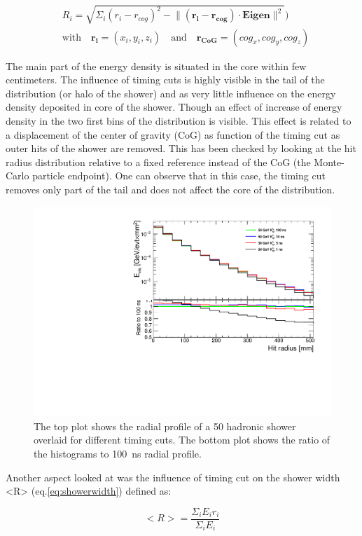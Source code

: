 \begin{equation} \label{eq:radialprof}
  \begin{split}
    & R_{i} = \sqrt{\Sigma_{i} (r_{i} - r_{cog})^{2} - \lVert (\mathbf{r_{i}} - \mathbf{r_{cog}}) \cdot \mathbf{Eigen} \rVert^{2}}) \\
    & \text{with} \quad \mathbf{r_{i}} = (x_i, y_i, z_i) \quad \text{and} \quad \mathbf{r_{CoG}} = (cog_x, cog_y, cog_z)
  \end{split}
\end{equation}

The main part of the energy density is situated in the core within few centimeters. The influence of timing cuts is highly visible in the tail of the distribution (or halo of the shower) and as very little influence on the energy density deposited in core of the shower. Though an effect of increase of energy density in the two first bins of the distribution is visible. This effect is related to a displacement of the center of gravity (CoG) as function of the timing cut as outer hits of the shower are removed. This has been checked by looking at the hit radius distribution relative to a fixed reference instead of the CoG (the Monte-Carlo particle endpoint). One can observe that in this case, the timing cut removes only part of the tail and does not affect the core of the distribution.

\begin{figure}[htbp!]
  \centering
  \includegraphics[width=0.5\linewidth]{chap6/fig_TimingILD/NoSmearing/RadialProfileOverlay_noSmearing}
  \caption{The top plot shows the radial profile of a 50 \GeV hadronic shower overlaid for different timing cuts. The bottom plot shows the ratio of the histograms to \SI{100}{\nano\second} radial profile.} \label{fig:RadialProfNoSmearing}
\end{figure}

Another aspect looked at was the influence of timing cut on the shower width <R> (eq.\ref{eq:showerwidth}) defined as:

\begin{equation} \label{eq:showerwidth}
  <R> = \frac{\Sigma_i E_i r_i}{\Sigma_i E_i}
\end{equation}
\vspace{1ex}

